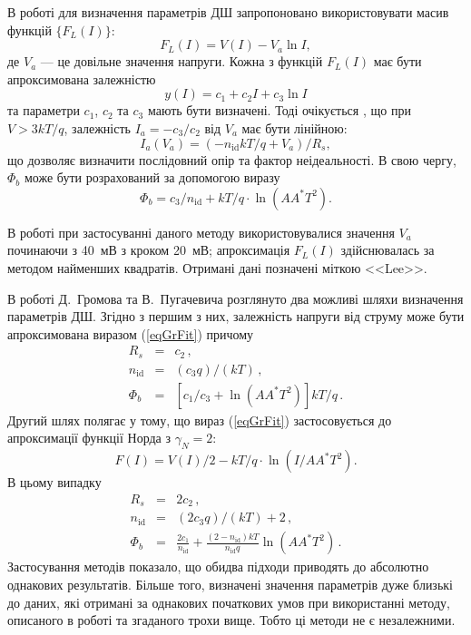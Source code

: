 В роботі \cite{Lee} для визначення параметрів ДШ запропоновано використовувати масив функцій $\{F_L(I)\}$:
\begin{equation}
\label{eqLee}
F_L(I)=V(I)-V_a\ln I,
\end{equation}
де
$V_a$ --- це довільне значення напруги.
Кожна з функцій $F_L(I)$ має бути апроксимована залежністю
\begin{equation}
\label{eqGrFit}
y(I)=c_1+c_2I+c_3\ln I
\end{equation}
та параметри $c_1$, $c_2$ та $c_3$ мають бути визначені.
Тоді очікується \cite{Lee}, що при $V>3kT/q$,
залежність $I_a=-c_3/c_2$ від $V_a$ має бути лінійною:
\begin{equation}
\label{eqLeeDet}
I_a(V_a)=(-n_\mathrm{id}kT/q+V_a)/R_s,
\end{equation}
що дозволяє визначити послідовний опір та фактор неідеальності.
В свою чергу, $\Phi_b$ може бути розрахований \cite{Lee} за допомогою виразу
\begin{equation}
\label{eqLeeFb}
\Phi_b=c_3/n_\mathrm{id}+kT/q\cdot\ln\left(AA^*T^2\right).
\end{equation}

В роботі при застосуванні даного методу використовувалися значення $V_a$ починаючи з 40~мВ з кроком 20~мВ;
апроксимація $F_L(I)$ здійснювалась за методом найменших квадратів.
Отримані дані позначені міткою <<Lee>>.

В роботі Д.~Громова та В.~Пугачевича \cite{Gromov} розглянуто два можливі шляхи визначення параметрів ДШ.
Згідно з першим з них, залежність напруги від струму може бути апроксимована виразом (\ref{eqGrFit}) причому
\begin{eqnarray}
\label{eqGr1}
R_s&=&c_2\,,
\\
n_\mathrm{id}&=&(c_3q)/(kT)\,,
\\
\Phi_b&=&\left[c_1/c_3+\ln\left(AA^*T^2\right)\right]kT/q\,.
\end{eqnarray}
Другий шлях полягає у тому, що вираз (\ref{eqGrFit}) застосовується до апроксимації функції Норда з $\gamma_N=2$:
\begin{equation}
\label{eqGr2}
F(I)=V(I)/2-kT/q\cdot\ln(I/AA^*T^2).
\end{equation}
В цьому випадку \cite{Gromov}
\begin{eqnarray}
\label{eqGr2Det}
R_s&=&2c_2\,,
\\
n_\mathrm{id}&=&(2c_3q)/(kT)+2\,,
\\
\Phi_b&=&\frac{2c_1}{n_\mathrm{id}}+\frac{(2-n_\mathrm{id})kT}{n_\mathrm{id}q}\ln\left(AA^*T^2\right)\,.
\end{eqnarray}
Застосування методів показало, що обидва підходи приводять до абсолютно однакових результатів.
Більше того, визначені значення параметрів дуже близькі до даних, які отримані за однакових початкових умов при використанні методу, описаного в роботі \cite{Lee} та згаданого трохи вище.
Тобто ці методи не є незалежними.

